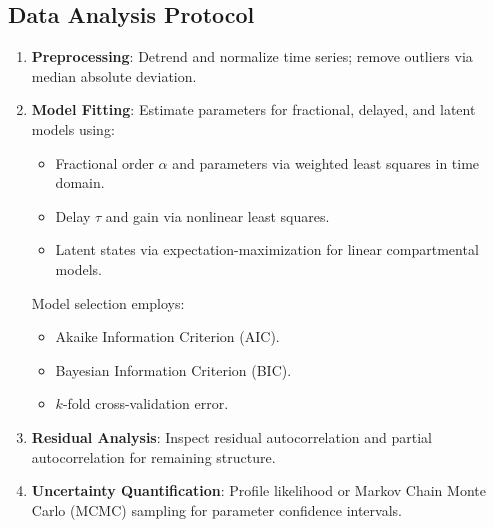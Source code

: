 \subsection{Data Analysis Protocol}
\begin{enumerate}
    \item \textbf{Preprocessing}: Detrend and normalize time series; remove outliers via median absolute deviation.
    \item \textbf{Model Fitting}: Estimate parameters for fractional, delayed, and latent models using:
          \begin{itemize}
              \item Fractional order $\alpha$ and parameters via weighted least squares in time domain.
              \item Delay $\tau$ and gain via nonlinear least squares.
              \item Latent states via expectation-maximization for linear compartmental models.
          \end{itemize}
          Model selection employs:
          \begin{itemize}
              \item Akaike Information Criterion (AIC).
              \item Bayesian Information Criterion (BIC).
              \item $k$-fold cross-validation error.
          \end{itemize}
    \item \textbf{Residual Analysis}: Inspect residual autocorrelation and partial autocorrelation for remaining structure.
    \item \textbf{Uncertainty Quantification}: Profile likelihood or Markov Chain Monte Carlo (MCMC) sampling for parameter confidence intervals.
\end{enumerate}

